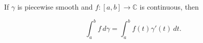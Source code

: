 If $\gamma$ is piecewise smooth and $f: [a, b] \to \mathbb{C}$ is continuous, then

$$\int_{a}^{b} f \, d\gamma = \int_{a}^{b} f(t) \gamma'(t) \, dt.$$
